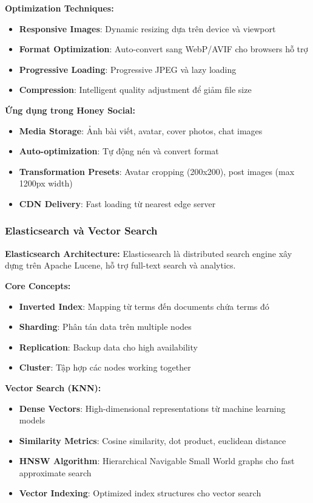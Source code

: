 \textbf{Optimization Techniques:}
\begin{itemize}
\item \textbf{Responsive Images}: Dynamic resizing dựa trên device và viewport
\item \textbf{Format Optimization}: Auto-convert sang WebP/AVIF cho browsers hỗ trợ
\item \textbf{Progressive Loading}: Progressive JPEG và lazy loading
\item \textbf{Compression}: Intelligent quality adjustment để giảm file size
\end{itemize}

\textbf{Ứng dụng trong Honey Social:}
\begin{itemize}
\item \textbf{Media Storage}: Ảnh bài viết, avatar, cover photos, chat images
\item \textbf{Auto-optimization}: Tự động nén và convert format
\item \textbf{Transformation Presets}: Avatar cropping (200x200), post images (max 1200px width)
\item \textbf{CDN Delivery}: Fast loading từ nearest edge server
\end{itemize}

\subsubsection{Elasticsearch và Vector Search}
\textbf{Elasticsearch Architecture:}
Elasticsearch là distributed search engine xây dựng trên Apache Lucene, hỗ trợ full-text search và analytics.

\textbf{Core Concepts:}
\begin{itemize}
\item \textbf{Inverted Index}: Mapping từ terms đến documents chứa terms đó
\item \textbf{Sharding}: Phân tán data trên multiple nodes
\item \textbf{Replication}: Backup data cho high availability
\item \textbf{Cluster}: Tập hợp các nodes working together
\end{itemize}

\textbf{Vector Search (KNN):}
\begin{itemize}
\item \textbf{Dense Vectors}: High-dimensional representations từ machine learning models
\item \textbf{Similarity Metrics}: Cosine similarity, dot product, euclidean distance
\item \textbf{HNSW Algorithm}: Hierarchical Navigable Small World graphs cho fast approximate search
\item \textbf{Vector Indexing}: Optimized index structures cho vector search
\end{itemize}

